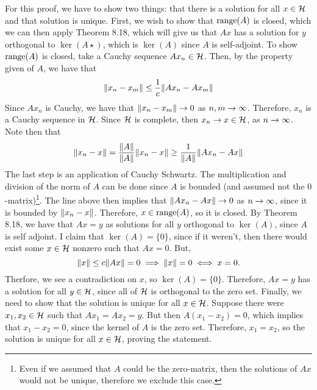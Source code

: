 \begin{solution}

    For this proof, we have to show two things: that there is a solution for all $x \in \mathcal{H}$ and that solution is unique. First, we wish to show that $\text{range} (A)$ is closed, which we can then apply Theorem 8.18, which will give us that $Ax$ has a solution for $y$ orthogonal to $\ker (A\star)$, which is $\ker(A)$ since $A$ is self-adjoint. To show $\text{range} (A)$ is closed, take a Cauchy sequence $Ax_n \in\mathcal{H}$. Then, by the property given of $A$, we have that 
    \[\norm{x_n - x_m} \leq \frac{1}{c}\norm{Ax_n - Ax_m}\]
    Since $Ax_n$ is Cauchy, we have that $\norm{x_n - x_m} \rightarrow 0$ as $n, m \rightarrow \infty$. Therefore, $x_n$ is a Cauchy sequence in $\mathcal{H}$. Since $\mathcal{H}$ is complete, then $x_n \rightarrow x \in \mathcal{H}$, as $n \rightarrow \infty$. Note then that
    \[\norm{x_n - x} = \frac{\norm{A}}{\norm{A}}\norm{x_n - x} \geq \frac{1}{\norm{A}}\norm{Ax_n - Ax}\]
    The last step is an application of Cauchy Schwartz. The multiplication and division of the norm of $A$ can be done since $A$ is bounded (and assumed not the $0$-matrix)\footnote{Even if we assumed that $A$ could be the zero-matrix, then the solutions of $Ax$ would not be unique, therefore we exclude this case.}. The line above then implies that $\norm{Ax_n - Ax} \rightarrow 0$ as $n \rightarrow \infty$, since it is bounded by $\norm{x_n - x}$. Therefore, $x\in \text{range} (A)$, so it is closed. By Theorem 8.18, we have that $Ax = y$ as solutions for all $y$ orthogonal to $\ker (A)$, since $A$ is self adjoint. I claim that $\ker (A) = \{0\}$, since if it weren't, then there would exist some $x \in \mathcal{H}$ nonzero such that $Ax = 0$. But, 
    \[\norm{x} \leq c\norm{Ax} = 0 \implies \norm{x} = 0 \iff x = 0.\]
    Therfore, we see a contradiction on $x$, so $\ker (A) = \{0\}$. Therefore, $Ax = y$ has a solution for all $y \in \mathcal{H}$, since all of $\mathcal{H}$ is orthogonal to the zero set. Finally, we need to show that the solution is unique for all $x \in \mathcal{H}$. Suppose there were $x_1, x_2 \in \mathcal{H}$ such that $Ax_1 = Ax_2 = y$. But then $A(x_1 - x_2) = 0$, which implies that $x_1 - x_2 = 0$, since the kernel of $A$ is the zero set. Therefore, $x_1 = x_2$, so the solution is unique for all $x \in \mathcal{H}$, proving the statement. 
\end{solution}

\newpage

